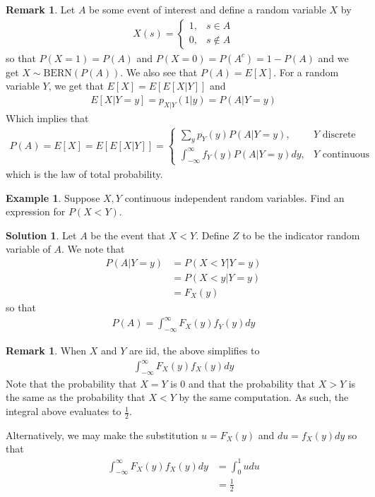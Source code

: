 \documentclass[11pt]{amsart}
\theoremstyle{definition}
\newtheorem{remark}[theorem]{Remark}
\newtheorem{example}[theorem]{Example}
\newtheorem{solution}[theorem]{Solution}
\numberwithin{equation}{section}
\begin{document}
 \begin{remark}
     Let $A$ be some event of interest and define a random variable $X$ by
     \begin{align*}
         X(s)=\begin{cases}
             1, & s\in A\\
             0, & s\not\in A
         \end{cases}
     \end{align*}
     so that $P(X=1)=P(A)$ and $P(X=0)=P(A^c)=1-P(A)$ and we get $X\sim\mathrm{BERN}(P(A))$. We also see that $P(A)=E[X]$. For a random variable $Y$, we get that $E[X]=E[E[X|Y]]$ and
     \begin{align*}
        E[X|Y=y]=p_{X|Y}(1|y)=P(A|Y=y)
     \end{align*}
     Which implies that
     \begin{align*}
         P(A)=E[X]=E[E[X|Y]]=\begin{cases}
             \sum_{y}p_Y(y)P(A|Y=y), & Y\text{ discrete}\\
             \int_{-\infty}^\infty f_Y(y)P(A|Y=y)dy, & Y\text{ continuous}
         \end{cases}
     \end{align*}
     which is the law of total probability.
 \end{remark}
 \begin{example}
     Suppose $X,Y$ continuous independent random variables. Find an expression for $P(X<Y)$.
 \end{example}
 \addtocounter{theorem}{-1}
 \begin{solution}
     Let $A$ be the event that $X<Y$. Define $Z$ to be the indicator random variable of $A$. We note that 
     \begin{align*}
         P(A|Y=y)&=P(X<Y|Y=y)\\
         &=P(X<y|Y=y)\\
         &=F_X(y)
     \end{align*}
     so that
     \begin{align*}
         P(A)=\int_{-\infty}^\infty F_X(y)f_Y(y)dy
     \end{align*}
 \end{solution}
 \begin{remark}
     When $X$ and $Y$ are iid, the above simplifies to
     \begin{align*}
         \int_{-\infty}^\infty F_X(y)f_X(y)dy
     \end{align*}
     Note that the probability that $X=Y$ is 0 and that the probability that $X>Y$ is the same as the probability that $X<Y$ by the same computation. As such, the integral above evaluates to $\frac{1}{2}$.

     Alternatively, we may make the substitution $u=F_X(y)$ and $du=f_X(y)dy$ so that
     \begin{align*}
         \int_{-\infty}^\infty F_X(y)f_X(y)dy&=\int_0^1udu\\
         &=\frac{1}{2}
     \end{align*}
 \end{remark}
\end{document}

